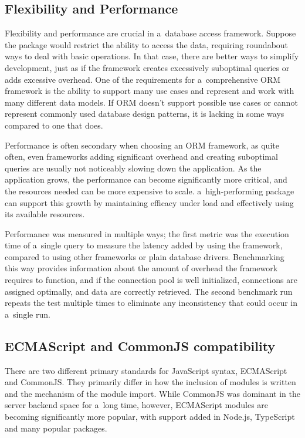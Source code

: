 \subsection{Flexibility and Performance}

Flexibility and performance are crucial in a~database access framework. Suppose
the package would restrict the ability to access the data, requiring roundabout
ways to deal with basic operations. In that case, there are better ways to
simplify development, just as if the framework creates excessively suboptimal
queries or adds excessive overhead. One of the requirements for a~comprehensive
ORM framework is the ability to support many use cases and represent and work
with many different data models. If ORM doesn't support possible use cases or
cannot represent commonly used database design patterns, it is lacking in some
ways compared to one that does.

Performance is often secondary when choosing an ORM framework, as quite often,
even frameworks adding significant overhead and creating suboptimal queries are
usually not noticeably slowing down the application. As the application grows,
the performance can become significantly more critical, and the resources needed
can be more expensive to scale. a~high-performing package can support this
growth by maintaining efficacy under load and effectively using its available
resources.

Performance was measured in multiple ways; the first metric was the execution
time of a~single query to measure the latency added by using the framework,
compared to using other frameworks or plain database drivers. Benchmarking this
way provides information about the amount of overhead the framework requires to
function, and if the connection pool is well initialized, connections are
assigned optimally, and data are correctly retrieved. The second benchmark run
repeats the test multiple times to eliminate any inconsistency that could occur
in a~single run.

\subsection{ECMAScript and CommonJS compatibility}
There are two different primary standards for JavaScript syntax, ECMAScript and
CommonJS. They primarily differ in how the inclusion of modules is written and
the mechanism of the module import. While CommonJS was dominant in the server
backend space for a~long time, however, ECMAScript modules are becoming
significantly more popular, with support added in Node.js, TypeScript and many
popular packages.

